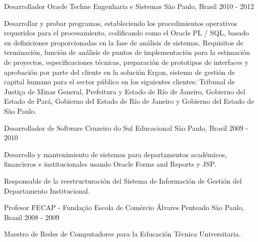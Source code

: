 \begin{cventries}
  \cventry
    {Desarrollador Oracle} %
    {Techne Engenharia e Sistemas} %
	{São Paulo, Brasil} %
    {2010 - 2012} %
    {
      \begin{cvitems} %
        \item {Desarrollar y probar programas, estableciendo los procedimientos operativos requeridos para el procesamiento, codificando como el Oracle PL / SQL, basado en definiciones proporcionadas en la fase de análisis de sistemas.
Requisitos de terminación, función de análisis de puntos de implementación para la estimación de proyectos, especificaciones técnicas, preparación de prototipos de interfaces y aprobación por parte del cliente en la solución Ergon, sistema de gestión de capital humano para el sector público en los siguientes clientes: Tribunal de Justiça de Minas General, Prefeitura y Estado de Río de Janeiro, Gobierno del Estado de Pará, Gobierno del Estado de Río de Janeiro y Gobierno del Estado de São Paulo.}
      \end{cvitems}
    }

  \cventry
    {Desarrollador de Software} %
    {Cruzeiro do Sul Educacional} %
    {São Paulo, Brasil} %
    {2009 - 2010} %
    {
      \begin{cvitems} %
        \item {Desarrollo y mantenimiento de sistemas para departamentos académicos, financieros e institucionales usando Oracle Forms and Reports y JSP.}
        \item {Responsable de la reestructuración del Sistema de Información de Gestión del Departamento Institucional.}
      \end{cvitems}
    }

  \cventry
    {Profesor} %
    {FECAP - Fundação Escola de Comércio Álvares Penteado} %
    {São Paulo, Brazil} %
    {2008 - 2009} %
    {
      \begin{cvitems} %
        \item {Maestro de Redes de Computadores para la Educación Técnica Universitaria.}
      \end{cvitems}
    }


\end{cventries}
